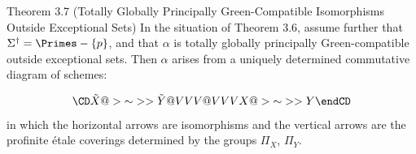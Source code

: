 \proclaim
{Theorem 3.7 (Totally Globally Principally Green-Compatible Isomorphisms 
Outside Exceptional Sets)} 
In the situation of Theorem 3.6, assume further that 
$\Sigma^{\dag}=\Primes-\{p\}$, and that $\alpha$ is 
totally globally principally Green-compatible outside exceptional sets. 
Then $\alpha$ arises from a uniquely determined commutative diagram of schemes:

$$
\CD
\Tilde X @>{\sim}>> \Tilde Y \\
@VVV   @VVV \\
X @>{\sim}>> Y \\
\endCD
$$
in which the horizontal arrows are isomorphisms and the vertical arrows are the 
profinite \'etale coverings determined by the groups $\Pi_X$, $\Pi_Y$.
\endproclaim

